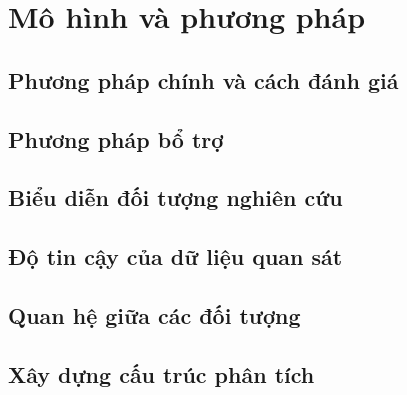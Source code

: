 \par{}
\section{Mô hình và phương pháp}\label{section:methods-1}

\par{}
\subsection{Phương pháp chính và cách đánh giá}\label{subsection:methods-2}

\par{}
\subsection{Phương pháp bổ trợ}\label{subsection:methods-3}

\par{}
\subsection{Biểu diễn đối tượng nghiên cứu}\label{subsection:methods-4}

\par{}
\subsection{Độ tin cậy của dữ liệu quan sát}\label{subsection:methods-5}

\par{}
\subsection{Quan hệ giữa các đối tượng}\label{subsection:methods-6}

\par{}
\subsection{Xây dựng cấu trúc phân tích}\label{subsection:methods-7}


